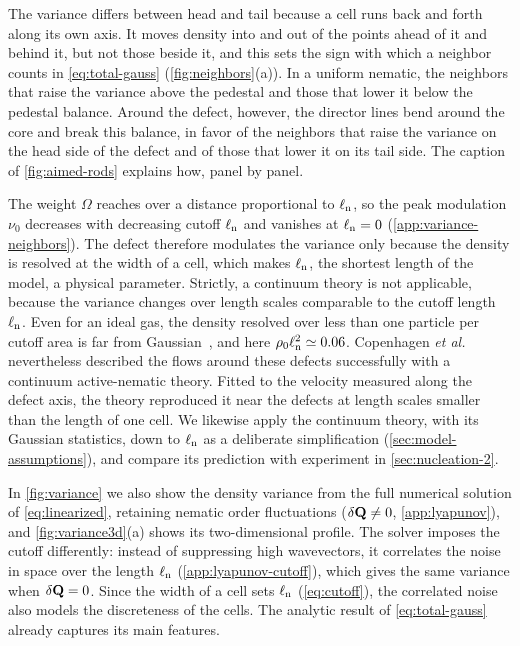 \documentclass[aps,pre,reprint,superscriptaddress,longbibliography,nofootinbib
]{revtex4-2}
\begin{document}
The variance differs between head and tail because a cell
runs back and forth along its own axis. It moves density
into and out of the points ahead of it and behind it, but
not those beside it, and this sets the sign with which a
neighbor counts in \cref{eq:total-gauss}
(\cref{fig:neighbors}(a)). In a uniform nematic, the
neighbors that raise the variance above the pedestal and
those that lower it below the pedestal balance. Around the
defect, however, the director lines bend around the core
and break this balance, in favor of the neighbors that
raise the variance on the head side of the defect and of
those that lower it on its tail side. The caption of
\cref{fig:aimed-rods} explains how, panel by panel.

The weight $\Omega$ reaches over a distance proportional to
$\ell_{\rm n}$, so the peak modulation $\nu_0$ decreases with
decreasing cutoff $\ell_{\rm n}$ and vanishes at $\ell_{\rm n}=0$
(\cref{app:variance-neighbors}). The defect therefore
modulates the variance only because the density is resolved
at the width of a cell, which makes $\ell_{\rm n}$, the shortest
length of the model, a physical parameter. Strictly, a
continuum theory is not applicable, because the variance
changes over length scales comparable to the cutoff
length $\ell_{\rm n}$. Even for an ideal gas, the density resolved
over less than one particle per cutoff area is far from
Gaussian~\cite{velenich2008brownian}, and here
$\rho_0\ell_{\rm n}^2\simeq0.06$. Copenhagen \textit{et
al.}~\cite{copenhagen2021} nevertheless described the flows
around these defects successfully with a continuum
active-nematic theory. Fitted to the velocity measured
along the defect axis, the theory reproduced it near the
defects at length scales smaller than the length of one
cell.
We likewise apply the continuum theory, with its Gaussian
statistics, down to $\ell_{\rm n}$ as a deliberate simplification
(\cref{sec:model-assumptions}), and compare its prediction
with experiment in \cref{sec:nucleation-2}.

In \cref{fig:variance} we also show the density variance
from the full numerical solution of \cref{eq:linearized},
retaining nematic order fluctuations ($\delta\mathbf{Q}\ne0$,
\cref{app:lyapunov}), and \cref{fig:variance3d}(a) shows
its two-dimensional profile. The solver imposes the cutoff
differently: instead of suppressing high wavevectors, it
correlates the noise in space over the length $\ell_{\rm n}$
(\cref{app:lyapunov-cutoff}), which gives the same variance
when $\delta\mathbf{Q}=0$. Since the width of a cell sets $\ell_{\rm n}$
(\cref{eq:cutoff}), the correlated noise also models the
discreteness of the cells. The analytic result of
\cref{eq:total-gauss} already captures its main features.
\end{document}

